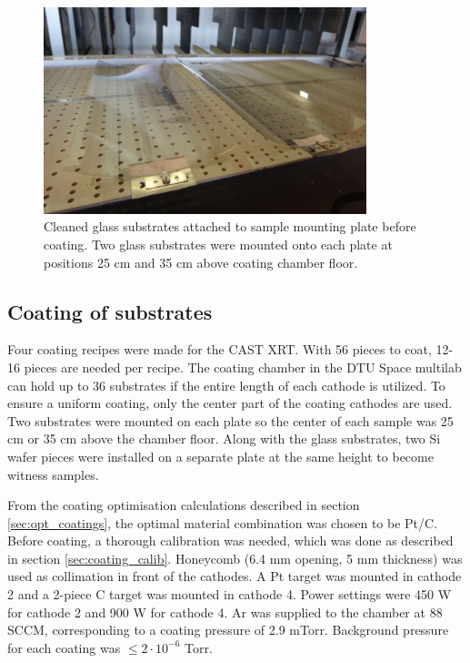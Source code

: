 \begin{figure}[htbp]
  \centering
    \includegraphics[height=6cm]{figures/cast/coating_mount.jpg}
  \caption{\footnotesize Cleaned glass substrates attached to sample mounting plate before coating. Two glass substrates were mounted onto each plate at positions 25 cm and 35 cm above coating chamber floor.}
  \label{fig:coating_mount}
\end{figure}

\subsection{Coating of substrates}
Four coating recipes were made for the CAST XRT. With 56 pieces to coat, 12-16 pieces are needed per recipe. The  coating chamber in the DTU Space multilab can hold up to 36 substrates if the entire length of each cathode is utilized. To ensure a uniform coating, only the center part of the coating cathodes are used. Two substrates were mounted on each plate so the center of each sample was 25 cm or 35 cm above the chamber floor. Along with the glass substrates, two Si wafer pieces were installed on a separate plate at the same height to become witness samples.

From the coating optimisation calculations described in section \ref{sec:opt_coatings}, the optimal material combination was chosen to be Pt/C. Before coating, a thorough calibration was needed, which was done as described in section \ref{sec:coating_calib}. Honeycomb (6.4 mm opening, 5 mm thickness) was used as collimation in front of the cathodes. A Pt target was mounted in cathode 2 and a 2-piece C target was mounted in cathode 4. Power settings were 450 W for cathode 2 and 900 W for cathode 4. Ar was supplied to the chamber at 88 SCCM, corresponding to a coating pressure of 2.9 mTorr. Background pressure for each coating was $\leq 2\cdot10^{-6}$ Torr.


